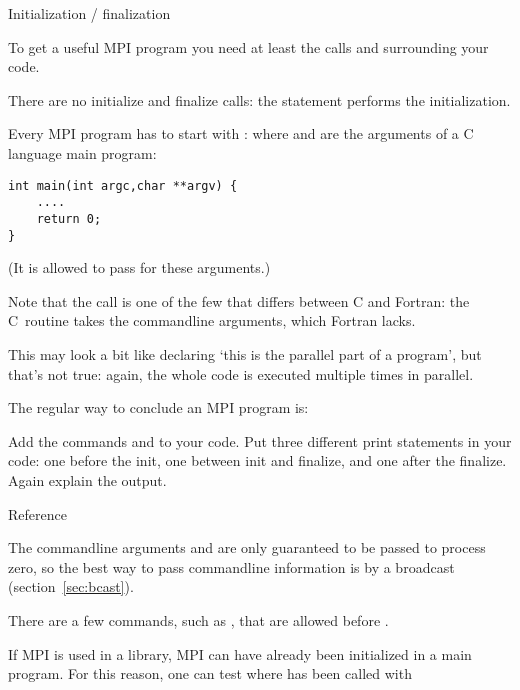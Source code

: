  {Initialization / finalization}
\label{sec:mpi-init}

To get a useful MPI program you need at least the calls
 and  surrounding
your code.

\begin{pythonnote}
  There are no initialize and finalize calls: the  statement
  performs the initialization.
\end{pythonnote}

Every MPI program has to start with :
%
%
where  and  are the arguments
of a C language main program:
\begin{verbatim}
int main(int argc,char **argv) {
    ....
    return 0;
}
\end{verbatim}
(It is allowed to pass  for these arguments.)

Note that the  call is one of the few that differs between C and Fortran:
the C~routine takes the commandline arguments, which Fortran lacks.

This may look a bit like declaring `this is the parallel part of a
program', but that's not true: again, the whole code is executed
multiple times in parallel.

The regular way to conclude an MPI program is:
%

\begin{exercise}
  \label{ex:hello2}
  Add the commands  and 
  to your code. Put three different print statements in your code: one before the init,
  one between init and finalize, and one after the finalize. Again explain the output.
\end{exercise}

 {Reference}

The commandline arguments  and  are only guaranteed to
be passed to process zero, so the best way to pass commandline information
is by a broadcast (section~\ref{sec:bcast}).

There are a few commands, such as
, that are allowed before
.

If MPI is used in a library, MPI can have already been initialized in a main program.
For this reason, one can test where  has been called with
%
%

